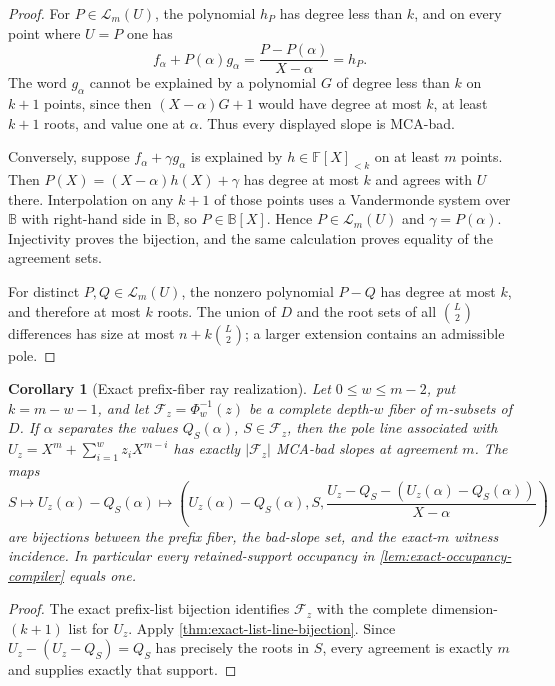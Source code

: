\documentclass[12pt,a4paper]{amsart}
\numberwithin{equation}{section}
\newtheorem{corollary}[corollary]{Corollary}
\theoremstyle{remark}
\newcommand{\F}{\mathbb F}
\newcommand{\B}{\mathbb B}
\newcommand{\Fcal}{\mathcal F}
\newcommand{\Lcal}{\mathcal L}
\newcommand{\abs}[1]{\lvert #1\rvert}
\begin{document}
\begin{proof}
For \(P\in\Lcal_m(U)\), the polynomial \(h_P\) has degree less than
\(k\), and on every point where \(U=P\) one has
\[
 f_\alpha+P(\alpha)g_\alpha
   =\frac{P-P(\alpha)}{X-\alpha}=h_P.
\]
The word \(g_\alpha\) cannot be explained by a polynomial \(G\) of degree
less than \(k\) on \(k+1\) points, since then
\((X-\alpha)G+1\) would have degree at most \(k\), at least \(k+1\)
roots, and value one at \(\alpha\).  Thus every displayed slope is
MCA-bad.

Conversely, suppose \(f_\alpha+\gamma g_\alpha\) is explained by
\(h\in\F[X]_{<k}\) on at least \(m\) points.  Then
\(P(X)=(X-\alpha)h(X)+\gamma\) has degree at most \(k\) and agrees with
\(U\) there.  Interpolation on any \(k+1\) of those points uses a
Vandermonde system over \(\B\) with right-hand side in \(\B\), so
\(P\in\B[X]\).  Hence \(P\in\Lcal_m(U)\) and
\(\gamma=P(\alpha)\).  Injectivity proves the bijection, and the same
calculation proves equality of the agreement sets.

For distinct \(P,Q\in\Lcal_m(U)\), the nonzero polynomial \(P-Q\) has
degree at most \(k\), and therefore at most \(k\) roots.  The union of
\(D\) and the root sets of all \(\binom L2\) differences has size at most
\(n+k\binom L2\); a larger extension contains an admissible pole.
\end{proof}

\begin{corollary}[Exact prefix-fiber ray realization]
\label{cor:exact-prefix-ray-realization}
Let \(0\le w\le m-2\), put \(k=m-w-1\), and let
\(\Fcal_z=\Phi_w^{-1}(z)\) be a complete depth-\(w\) fiber of
\(m\)-subsets of \(D\).  If \(\alpha\) separates the values
\(Q_S(\alpha)\), \(S\in\Fcal_z\), then the pole line associated with
\(U_z=X^m+\sum_{i=1}^wz_iX^{m-i}\) has exactly
\(\abs{\Fcal_z}\) MCA-bad slopes at agreement \(m\).  The maps
\[
 S\longmapsto U_z(\alpha)-Q_S(\alpha)
 \longmapsto
 \left(U_z(\alpha)-Q_S(\alpha),S,
 \frac{U_z-Q_S-(U_z(\alpha)-Q_S(\alpha))}{X-\alpha}\right)
\]
are bijections between the prefix fiber, the bad-slope set, and the
exact-\(m\) witness incidence.  In particular every retained-support
occupancy in \cref{lem:exact-occupancy-compiler} equals one.
\end{corollary}

\begin{proof}
The exact prefix-list bijection identifies \(\Fcal_z\) with the complete
dimension-\((k+1)\) list for \(U_z\).  Apply
\cref{thm:exact-list-line-bijection}.  Since
\(U_z-(U_z-Q_S)=Q_S\) has precisely the roots in \(S\), every agreement
is exactly \(m\) and supplies exactly that support.
\end{proof}
\end{document}
